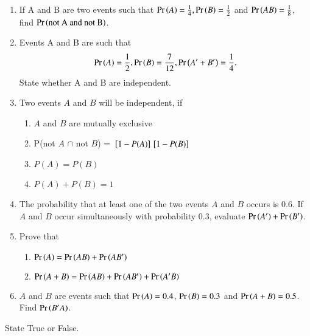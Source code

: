 \begin{enumerate}[label=\thesubsection.\arabic*,ref=\thesubsection.\theenumi]
\item  If A and B are two events such that $\Pr\left(A\right) = \frac{1}{4}, \Pr\left(B\right) = \frac{1}{2}$ and $\Pr\left(A B\right) = \frac{1}{8}$, find $\Pr\left(\text{not A and not B}\right)$.
	\\
\solution

\item Events A and B are such that 
\begin{align}
    \Pr\left(A\right)= \frac{1}{2},\Pr\left(B\right) = \frac{7}{12},  \Pr\left(A^{\prime}+B^{\prime}\right) = \frac{1}{4}.
\end{align}
State whether A and B are independent. 
	\\
\solution

%
%
\item Two events $A$ and $B$ will be independent, if
\begin{enumerate}
\item $A$ and $B$ are mutually exclusive
\item P(not $A$ $\cap$ not $B$) = ${}\left[1-P(A)\right]{}\left[1-P(B)\right] $
\item $P(A) = P(B)$
\item $P(A) + P(B) = 1$
\end{enumerate}
\solution

%
\item The probability that at least one of the two events $A$ and $B$ occurs is 0.6. If $A$ and $B$ occur simultaneously with probability 0.3, evaluate $\Pr\left(A^\prime\right) + \Pr\left(B^\prime\right)$.\\
\solution

\item Prove that
	\begin{enumerate}
	\item $\Pr\left(A\right) = \Pr\left(AB\right) + \Pr\left(AB^\prime\right)$
	\item $\Pr\left(A+B\right) = \Pr\left(AB\right) + \Pr\left(AB^\prime\right) + \Pr\left(A^\prime B\right)$
\label{it:exemplar/12/13/3/11}
	\end{enumerate}
\solution

\item $A$ and $B$ are events such that $\Pr\left(A\right) = 0.4$, $\Pr\left(B\right) = 0.3$ and $\Pr\left(A+B\right) = 0.5$. Find $\Pr\left(B^\prime A\right)$.
	\\
\solution

\end{enumerate}
State True or False.  
